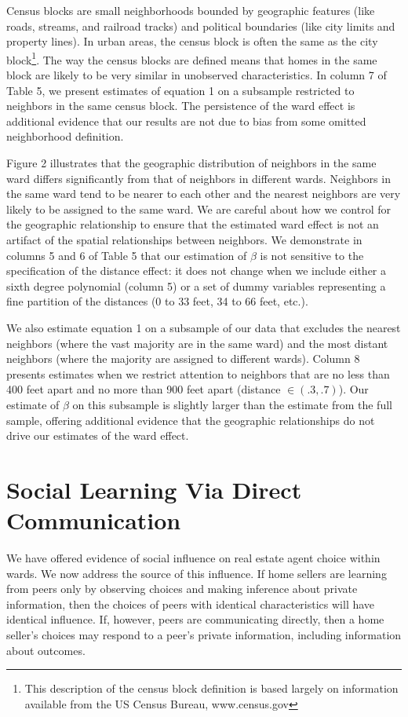 \documentclass[12pt]{article}
\begin{document}
    Census blocks are small neighborhoods bounded by geographic features (like roads, streams, and railroad tracks) and political boundaries (like
    city limits and property lines). In urban areas, the census block is often the same as the city block\footnote{This description of the census
    block definition is based largely on information available from the US Census Bureau, www.census.gov}. The way the census blocks are defined means
    that homes in the same block are likely to be very similar in unobserved characteristics. In column 7 of Table 5, we present estimates of equation 1
    on a subsample restricted to neighbors in the same census block. The persistence of the ward effect is additional evidence that our results are
    not due to bias from some omitted neighborhood definition.

    Figure 2 illustrates that the geographic distribution of neighbors in the same ward differs significantly from that of neighbors in different
    wards. Neighbors in the same ward tend to be nearer to each other and the nearest neighbors are very likely to be assigned to the same ward. We
    are careful about how we control for the geographic relationship to ensure that the estimated ward effect is not an artifact of the
    spatial relationships between neighbors. We demonstrate in columns 5 and 6 of Table 5 that our estimation of $\beta$ is not sensitive to the specification of the distance effect: it does
    not change when we include either a sixth degree polynomial (column 5) or a set of dummy variables representing a fine partition of the distances
    (0 to 33 feet, 34 to 66 feet, etc.).

    We also estimate equation 1 on a subsample of our data that excludes the nearest neighbors (where the vast majority are in the same ward) and the
    most distant neighbors (where the majority are assigned to different wards). Column 8 presents estimates when we restrict attention to neighbors
    that are no less than 400 feet apart and no more than 900 feet apart (distance $\in (.3,.7)$). Our estimate of $\beta$ on this subsample is
    slightly larger than the estimate from the full sample, offering additional evidence that the geographic relationships do not drive our estimates
    of the ward effect.

\section{Social Learning Via Direct Communication}
    We have offered evidence of social influence on real estate agent choice within wards.  We now address the
    source of this influence. If home sellers are learning from peers only by observing choices and making inference about private information, then
    the choices of peers with identical characteristics will have identical influence. If, however, peers are communicating directly, then a
    home seller's choices may respond to
    a peer's private information, including information about outcomes.
\end{document}
